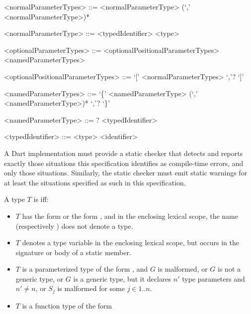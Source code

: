 \documentclass[makeidx]{article}
\begin{document}
{\begin{grammar}
<normalParameterTypes> ::= \gnewline{}
  <normalParameterType> (`,' <normalParameterType>)*

<normalParameterType> ::= <typedIdentifier>
  \alt <type>

<optionalParameterTypes> ::= <optionalPositionalParameterTypes>
  \alt <namedParameterTypes>

<optionalPositionalParameterTypes> ::= `[' <normalParameterTypes> `,'? `]'

<namedParameterTypes> ::=
  `\{' <namedParameterType> (`,' <namedParameterType>)* `,'? `\}'

<namedParameterType> ::=
  \REQUIRED{}? <typedIdentifier>

<typedIdentifier> ::= <type> <identifier>
\end{grammar}

\LMHash{}%
A Dart implementation must provide a static checker that detects and reports
exactly those situations this specification identifies as compile-time errors,
and only those situations.
Similarly, the static checker must emit static warnings
for at least the situations specified as such in this specification.


\LMHash{}%
A type $T$ is  if{}f:
\begin{itemize}
\item
  $T$ has the form \id{} or the form ,
  and in the enclosing lexical scope,
  the name \id{} (respectively )
  does not denote a type.
\item
  $T$ denotes a type variable in the enclosing lexical scope,
  but occurs in the signature or body of a static member.
\item
  $T$ is a parameterized type of the form ,
  and $G$ is malformed,
  or $G$ is not a generic type,
  or $G$ is a generic type,
  but it declares $n'$ type parameters and $n' \not= n$,
  or $S_j$ is malformed for some $j \in 1 .. n$.
\item
  $T$ is a function type of the form



\end{itemize}}
\end{document}
